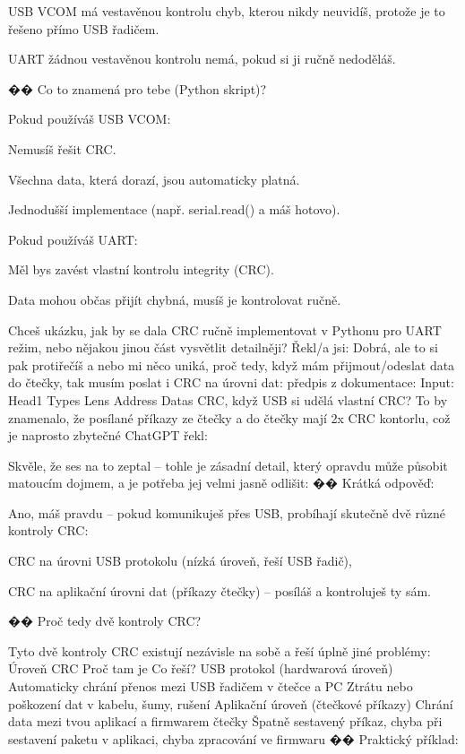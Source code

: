     USB VCOM má vestavěnou kontrolu chyb, kterou nikdy neuvidíš, protože je to řešeno přímo USB řadičem.

    UART žádnou vestavěnou kontrolu nemá, pokud si ji ručně nedoděláš.

�� Co to znamená pro tebe (Python skript)?

Pokud používáš USB VCOM:

    Nemusíš řešit CRC.

    Všechna data, která dorazí, jsou automaticky platná.

    Jednodušší implementace (např. serial.read() a máš hotovo).

Pokud používáš UART:

    Měl bys zavést vlastní kontrolu integrity (CRC).

    Data mohou občas přijít chybná, musíš je kontrolovat ručně.

Chceš ukázku, jak by se dala CRC ručně implementovat v Pythonu pro UART režim, nebo nějakou jinou část vysvětlit detailněji?
Řekl/a jsi:
Dobrá, ale to si pak protiřečíš a nebo mi něco uniká, proč tedy, když mám přijmout/odeslat data do čtečky, tak musím poslat i CRC na úrovni dat: předpis z dokumentace: Input: {Head1} {Types} {Lens} {Address} {Datas} {CRC}, když USB si udělá vlastní CRC? To by znamenalo, že posílané příkazy ze čtečky a do čtečky mají 2x CRC kontorlu, což je naprosto zbytečné
ChatGPT řekl:

Skvěle, že ses na to zeptal – tohle je zásadní detail, který opravdu může působit matoucím dojmem, a je potřeba jej velmi jasně odlišit:
�� Krátká odpověď:

Ano, máš pravdu – pokud komunikuješ přes USB, probíhají skutečně dvě různé kontroly CRC:

    CRC na úrovni USB protokolu (nízká úroveň, řeší USB řadič),

    CRC na aplikační úrovni dat (příkazy čtečky) – posíláš a kontroluješ ty sám.

�� Proč tedy dvě kontroly CRC?

Tyto dvě kontroly CRC existují nezávisle na sobě a řeší úplně jiné problémy:
Úroveň CRC	Proč tam je	Co řeší?
USB protokol (hardwarová úroveň)	Automaticky chrání přenos mezi USB řadičem v čtečce a PC	Ztrátu nebo poškození dat v kabelu, šumy, rušení
Aplikační úroveň (čtečkové příkazy)	Chrání data mezi tvou aplikací a firmwarem čtečky	Špatně sestavený příkaz, chyba při sestavení paketu v aplikaci, chyba zpracování ve firmwaru
�� Praktický příklad:

